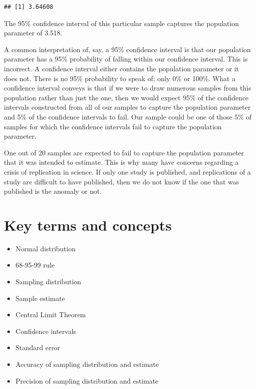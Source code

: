 \documentclass[
]{book}
\providecommand{\tightlist}{%
  \setlength{\itemsep}{0pt}\setlength{\parskip}{0pt}}
\newenvironment{learncheck}%
{%
  \par\vspace{\baselineskip}\noindent 
  \color{Exercise}\begin{itshape}%
  \par\vspace{\baselineskip}\noindent\ignorespaces 
}%
{%
  \end{itshape}\ignorespacesafterend 
}
\begin{document}
\begin{verbatim}
## [1] 3.64608
\end{verbatim}

The 95\% confidence interval of this particular sample captures the population parameter of 3.518.

A common interpretation of, say, a 95\% confidence interval is that our population parameter has a 95\% probability of falling within our confidence interval. This is incorrect. A confidence interval either contains the population parameter or it does not. There is no 95\% probability to speak of; only 0\% or 100\%. What a confidence interval conveys is that if we were to draw numerous samples from this population rather than just the one, then we would expect 95\% of the confidence intervals constructed from all of our samples to capture the population parameter and 5\% of the confidence intervals to fail. Our sample could be one of those 5\% of samples for which the confidence intervals fail to capture the population parameter.

One out of 20 samples are expected to fail to capture the population parameter that it was intended to estimate. This is why many have concerns regarding a crisis of replication in science. If only one study is published, and replications of a study are difficult to have published, then we do not know if the one that was published is the anomaly or not.

\hypertarget{kt10}{%
\section{Key terms and concepts}\label{kt10}}

\begin{learncheck}
\begin{itemize}
\tightlist
\item
  Normal distribution
\item
  68-95-99 rule
\item
  Sampling distribution
\item
  Sample estimate
\item
  Central Limit Theorem
\item
  Confidence intervals
\item
  Standard error
\item
  Accuracy of sampling distribution and estimate
\item
  Precision of sampling distribution and estimate
\end{itemize}
\end{learncheck}
\end{document}
